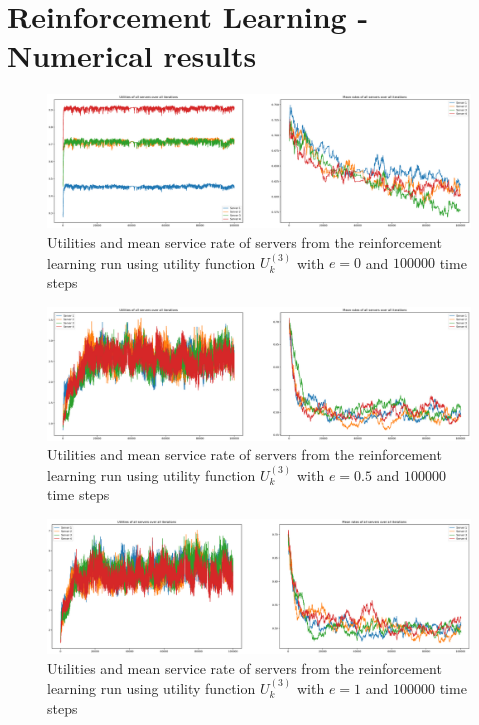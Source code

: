 \chapter{Reinforcement Learning - Numerical results}
\label{appendix:reinforcement_learning}

\begin{figure}[H]
    \includegraphics[width=\textwidth]{chapters/00_appendix/03_more_rl_results/Bin/utility_3_eps/u3_1_e0.eps}
    \caption{Utilities and mean service rate of servers from the reinforcement
    learning run using utility function \(U_k^{(3)}\) with \(e = 0\) and
    \(100000\) time steps}
    \label{fig:RL_utility3_1_e0}
\end{figure}

\begin{figure}[H]
    \includegraphics[width=\textwidth]{chapters/00_appendix/03_more_rl_results/Bin/utility_3_eps/u3_1_e05.eps}
    \caption{Utilities and mean service rate of servers from the reinforcement
    learning run using utility function \(U_k^{(3)}\) with \(e = 0.5\) and
    \(100000\) time steps}
    \label{fig:RL_utility3_1_e05}
\end{figure}

\begin{figure}[H]
    \includegraphics[width=\textwidth]{chapters/00_appendix/03_more_rl_results/Bin/utility_3_eps/u3_1_e1.eps}
    \caption{Utilities and mean service rate of servers from the reinforcement
    learning run using utility function \(U_k^{(3)}\) with \(e = 1\) and
    \(100000\) time steps}
    \label{fig:RL_utility3_1_e1}
\end{figure}

